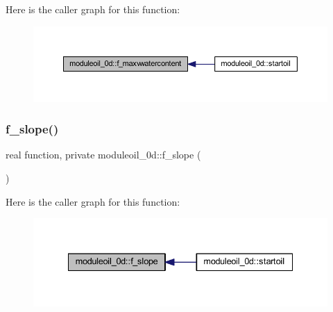 Here is the caller graph for this function\+:\nopagebreak
\begin{figure}[H]
\begin{center}
\leavevmode
\includegraphics[width=350pt]{namespacemoduleoil__0d_acf1e57739fa15b9c76feeec263af3ff1_icgraph}
\end{center}
\end{figure}
\mbox{\label{namespacemoduleoil__0d_ae99633ccabb196155d1a32fafef217b3}} 
\subsubsection{\texorpdfstring{f\+\_\+slope()}{f\_slope()}}
{\footnotesize\ttfamily real function, private moduleoil\+\_\+0d\+::f\+\_\+slope (\begin{DoxyParamCaption}{ }\end{DoxyParamCaption})\hspace{0.3cm}{\ttfamily [private]}}

Here is the caller graph for this function\+:\nopagebreak
\begin{figure}[H]
\begin{center}
\leavevmode
\includegraphics[width=335pt]{namespacemoduleoil__0d_ae99633ccabb196155d1a32fafef217b3_icgraph}
\end{center}
\end{figure}
\mbox{\label{namespacemoduleoil__0d_afe23376b4667259aea9a6e2163036417}} 
